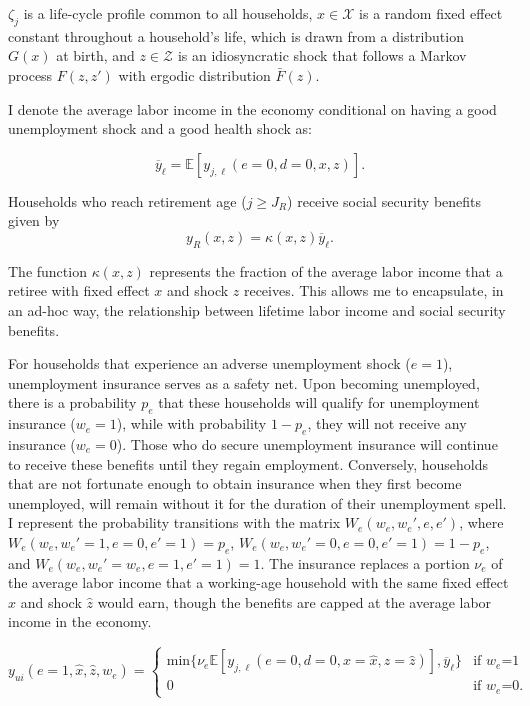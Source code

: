 \documentclass[parskip=full]{article}
\begin{document}
\noindent $\zeta_j$ is a life-cycle profile common to all households, $x\in \mathcal{X}$ is a random fixed effect constant throughout a household's life, which is drawn from a distribution $G(x)$ at birth, and $z\in \mathcal{Z}$ is an idiosyncratic shock that follows a Markov process $F(z,z')$ with ergodic distribution $\bar{F}(z)$.

I denote the average labor income in the economy conditional on having a good unemployment shock and a good health shock as: 

\begin{equation}
    \overline{y}_{\ell}=\mathbb{E}[y_{j,\ell}(e=0,d=0,x,z)].
\end{equation} 

\noindent Households who reach retirement age ($j\geq J_R$) receive social security benefits given by
\begin{equation}
    y_R(x,z) = \kappa(x,z) \overline{y}_{\ell}.
\end{equation}

\noindent The function $\kappa(x,z)$ represents the fraction of the average labor income that a retiree with fixed effect $x$ and shock $z$ receives. This allows me to encapsulate, in an ad-hoc way, the relationship between lifetime labor income and social security benefits. 

For households that experience an adverse unemployment shock ($e=1$), unemployment insurance serves as a safety net. Upon becoming unemployed, there is a probability $p_{e}$ that these households will qualify for unemployment insurance ($w_{e}=1$), while with probability $1-p_{e}$, they will not receive any insurance ($w_{e}=0$). Those who do secure unemployment insurance will continue to receive these benefits until they regain employment. Conversely, households that are not fortunate enough to obtain insurance when they first become unemployed, will remain without it for the duration of their unemployment spell. I represent the probability transitions with the matrix $W_{e}(w_{e},w_{e}',e,e')$, where $W_{e}(w_{e},w_{e}'=1,e=0,e'=1)=p_{e}$, $W_{e}(w_{e},w_{e}'=0,e=0,e'=1)=1-p_{e}$, and $W_{e}(w_{e},w_{e}'=w_{e},e=1,e'=1)=1$. The insurance replaces a portion $\nu_{e}$ of the average labor income that a working-age household with the same fixed effect $\hat{x}$ and shock $\hat{z}$ would earn, though the benefits are capped at the average labor income in the economy.

\begin{equation}
y_{ui}(e=1,\hat{x},\hat{z},w_{e}) = \begin{cases}
\mbox{min}\{\nu_{e} \mathbb{E}[y_{j,\ell}(e=0,d=0,x=\hat{x},z=\hat{z})],\overline{y}_{\ell}\} &\text{if $w_{e}$=1} \\
0 &\text{if $w_{e}$=0}.
\end{cases}
\end{equation}
\end{document}
